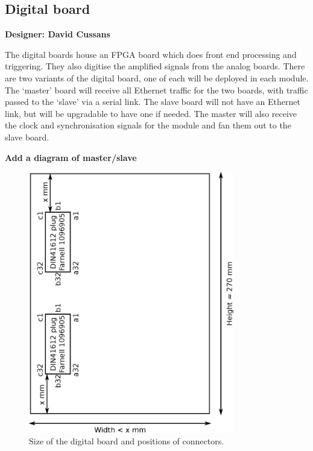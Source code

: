 \documentclass[a4paper]{article}
\begin{document}
\clearpage
\newpage

\subsection{Digital board}

{\bf Designer: David Cussans}

The digital boards house an FPGA board which does front end processing and triggering.
They also digitise the amplified signals from the analog boards.
There are two variants of the digital board, one of each will be deployed in each module.
The `master' board will receive all Ethernet traffic for the two boards, with traffic passed to the `slave' via a serial link.
The slave board will not have an Ethernet link, but will be upgradable to have one if needed.
The master will also receive the clock and synchronisation signals for the module and fan them out to the slave board.

{\bf Add a diagram of master/slave}

\begin{figure}[h]
    \begin{center}
        \includegraphics[width=0.8\textwidth]{imgs/digitalboardsize}
        \caption{Size of the digital board and positions of connectors.}
        \label{fig:digitalboardsize}
    \end{center}
\end{figure}
\end{document}
